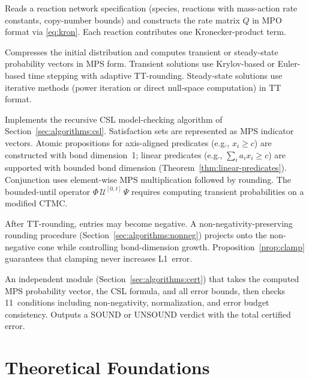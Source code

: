 \documentclass[11pt]{article}
\begin{document}
\begin{description}[leftmargin=1em,itemsep=3pt]
\item[Generator.]
  Reads a reaction network specification (species, reactions with
  mass-action rate constants, copy-number bounds) and constructs
  the rate matrix $Q$ in MPO format via \eqref{eq:kron}.
  Each reaction contributes one Kronecker-product term.

\item[TT Compress.]
  Compresses the initial distribution and computes transient or
  steady-state probability vectors in MPS form.
  Transient solutions use Krylov-based or Euler-based time stepping
  with adaptive TT-rounding.
  Steady-state solutions use iterative methods (power iteration
  or direct null-space computation) in TT format.

\item[CSL Checker.]
  Implements the recursive CSL model-checking algorithm of
  Section~\ref{sec:algorithms:csl}.
  Satisfaction sets are represented as MPS indicator vectors.
  Atomic propositions for axis-aligned predicates
  (e.g., $x_i \geq c$) are constructed with bond dimension~1;
  linear predicates (e.g., $\sum_i a_i x_i \geq c$) are
  supported with bounded bond dimension
  (Theorem~\ref{thm:linear-predicates}).
  Conjunction uses element-wise MPS multiplication followed by
  rounding.
  The bounded-until operator $\Phi\,\mathcal{U}^{[0,t]}\,\Psi$
  requires computing transient probabilities on a modified CTMC.

\item[Non-negativity Rounding.]
  After TT-rounding, entries may become negative.
  A non-negativity-preserving rounding procedure
  (Section~\ref{sec:algorithms:nonneg}) projects onto the
  non-negative cone while controlling bond-dimension growth.
  Proposition~\ref{prop:clamp} guarantees that clamping never
  increases L1~error.

\item[Certificate Verifier.]
  An independent module (Section~\ref{sec:algorithms:cert}) that
  takes the computed MPS probability vector, the CSL formula, and
  all error bounds, then checks 11~conditions including
  non-negativity, normalization, and error budget consistency.
  Outputs a SOUND or UNSOUND verdict with the total certified error.
\end{description}

\section{Theoretical Foundations}\label{sec:theory}
\end{document}
